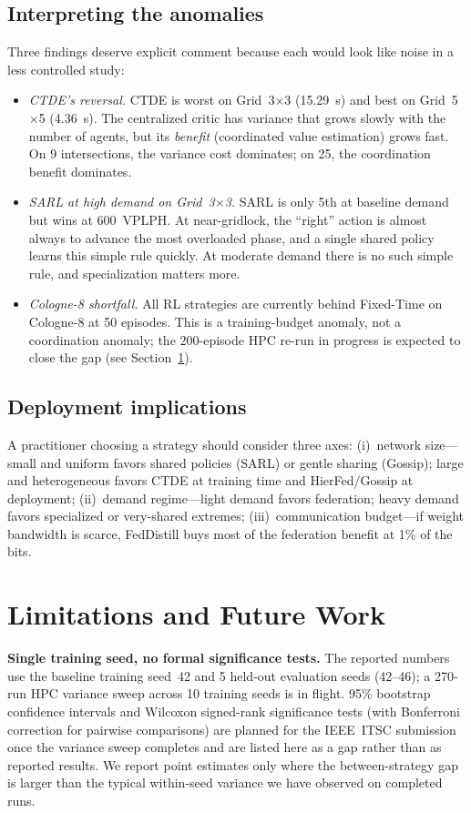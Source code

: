 \documentclass[conference]{IEEEtran}
\begin{document}
\subsection{Interpreting the anomalies}
Three findings deserve explicit comment because each would look like noise in a less controlled study:
\begin{itemize}
\item \emph{CTDE's reversal.} CTDE is worst on Grid~3$\times$3 (15.29~s) and best on Grid~5$\times$5 (4.36~s). The centralized critic has variance that grows slowly with the number of agents, but its \emph{benefit} (coordinated value estimation) grows fast. On 9 intersections, the variance cost dominates; on 25, the coordination benefit dominates.
\item \emph{SARL at high demand on Grid~3$\times$3.} SARL is only 5th at baseline demand but wins at 600~VPLPH. At near-gridlock, the ``right'' action is almost always to advance the most overloaded phase, and a single shared policy learns this simple rule quickly. At moderate demand there is no such simple rule, and specialization matters more.
\item \emph{Cologne-8 shortfall.} All RL strategies are currently behind Fixed-Time on Cologne-8 at 50 episodes. This is a training-budget anomaly, not a coordination anomaly; the 200-episode HPC re-run in progress is expected to close the gap (see Section~\ref{sec:limits}).
\end{itemize}

\subsection{Deployment implications}
A practitioner choosing a strategy should consider three axes:
(i)~network size---small and uniform favors shared policies (SARL) or gentle sharing (Gossip); large and heterogeneous favors CTDE at training time and HierFed/Gossip at deployment;
(ii)~demand regime---light demand favors federation; heavy demand favors specialized or very-shared extremes;
(iii)~communication budget---if weight bandwidth is scarce, FedDistill buys most of the federation benefit at 1\% of the bits.

\section{Limitations and Future Work}\label{sec:limits}

\textbf{Single training seed, no formal significance tests.} The reported numbers use the baseline training seed~42 and 5 held-out evaluation seeds (42--46); a 270-run HPC variance sweep across 10 training seeds is in flight. 95\% bootstrap confidence intervals and Wilcoxon signed-rank significance tests (with Bonferroni correction for pairwise comparisons) are planned for the IEEE~ITSC submission once the variance sweep completes and are listed here as a gap rather than as reported results. We report point estimates only where the between-strategy gap is larger than the typical within-seed variance we have observed on completed runs.
\end{document}
